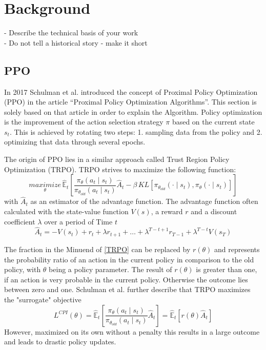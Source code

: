 \chapter{Background}\label{sec:Background}
- Describe the technical basis of your work \\
- Do not tell a historical story - make it short

\section{PPO}
In 2017 Schulman et al. introduced the concept of Proximal Policy Optimization (PPO) in
the article ``Proximal Policy Optimization Algorithms''\cite{scwo2017}.
This section is solely based on that article in order to explain the Algorithm.
Policy optimization is the improvement of the action selection strategy $\pi$ based on the
current state $s_{t}$. This is achieved by rotating two steps: 1. sampling data from the policy and 2.
optimizing that data through several epochs.

The origin of PPO lies in a similar approach called Trust Region Policy Optimization (TRPO).
TRPO strives to maximize the following function:
\begin{equation}\label{TRPO}
    \underset{\theta}{maximize}\,\hat{\mathbb{E}}_{t} [\frac{\pi_{\theta}(a_{t} \mid s_{t})}{\pi_{\theta_{old}}(a_{t} \mid s_{t})}
    \hat{A}_{t}-\beta \, KL[\pi_{\theta_{old}}(\cdot \mid s_{t}),\pi_{\theta}(\cdot \mid s_{t})]]
\end{equation}
with $\hat{A}_{t}$ as an estimator of the advantage function. The advantage function often calculated with the
state-value function $V(s)$, a reward $r$ and a discount coefficient $\lambda$ over a period of Time $t$
\begin{equation}\label{advantage}
    \hat{A}_{t} = -V(s_{t})+r_{t}+\lambda r_{t+1}+ \ldots + \lambda^{T-t+1} r_{T-1} + \lambda^{T-t} V(s_{T})
\end{equation}

The fraction in the Minuend of \eqref{TRPO} can be replaced by
$r(\theta)$ %
and represents the probability ratio of an
action in the current policy in comparison to the old policy, with $\theta$ being a policy parameter.
The result of $r(\theta)$ is greater than
one, if an action is very probable in the current policy. Otherwise the outcome lies between zero and one.
Schulman et al. further describe that TRPO maximizes the "surrogate" objective
\begin{equation}\label{TRPO surrogate}
    L^{CPI}(\theta) = \hat{\mathbb{E}}_{t}[ \frac{\pi_{\theta}(a_{t} \mid s_{t})}{\pi_{\theta_{old}}(a_{t} \mid s_{t})} \hat{A}_{t}]
    = \hat{\mathbb{E}}_{t}[r(\theta)\hat{A}_{t}]
\end{equation}
However, maximized on its own without a penalty this results in a large outcome and leads to drastic
policy updates.

